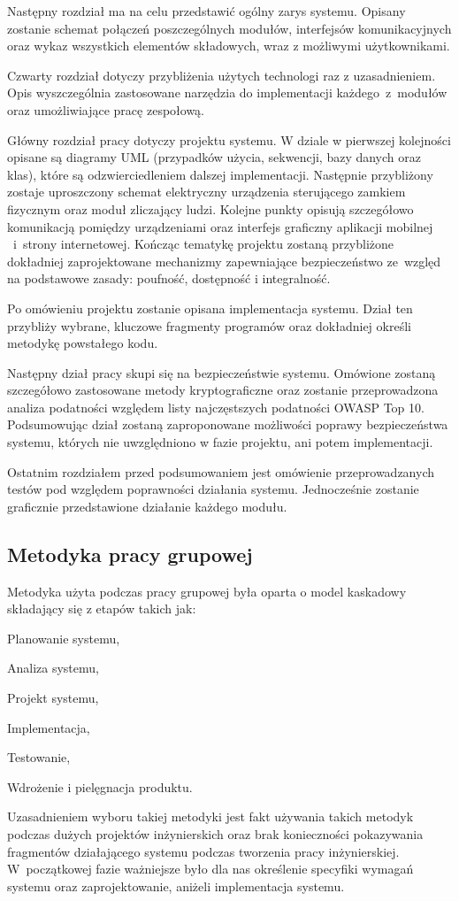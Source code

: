 Następny rozdział ma na celu przedstawić ogólny zarys systemu. Opisany zostanie schemat połączeń poszczególnych modułów, interfejsów komunikacyjnych oraz wykaz wszystkich elementów składowych, wraz z możliwymi użytkownikami.

Czwarty rozdział dotyczy przybliżenia użytych technologi raz z uzasadnieniem. Opis wyszczególnia zastosowane narzędzia do implementacji każdego~z~modułów oraz umożliwiające pracę zespołową.

Główny rozdział pracy dotyczy projektu systemu. W dziale w pierwszej kolejności opisane są diagramy UML (przypadków użycia, sekwencji, bazy danych oraz klas), które są odzwierciedleniem dalszej implementacji. Następnie przybliżony zostaje uproszczony schemat elektryczny urządzenia sterującego zamkiem fizycznym oraz moduł zliczający ludzi. Kolejne punkty opisują szczegółowo komunikacją pomiędzy urządzeniami oraz interfejs graficzny aplikacji mobilnej ~i~strony internetowej. Kończąc tematykę projektu zostaną przybliżone dokładniej zaprojektowane mechanizmy zapewniające bezpieczeństwo ze~względ na podstawowe zasady: poufność, dostępność i integralność.

Po omówieniu projektu zostanie opisana implementacja systemu. Dział ten przybliży wybrane, kluczowe fragmenty programów oraz dokładniej określi metodykę powstałego kodu. 

Następny dział pracy skupi się na bezpieczeństwie systemu. Omówione zostaną szczegółowo zastosowane metody kryptograficzne oraz zostanie przeprowadzona analiza podatności względem listy najczęstszych podatności OWASP Top 10. Podsumowując dział zostaną zaproponowane możliwości poprawy  bezpieczeństwa systemu, których nie uwzględniono w fazie projektu, ani potem implementacji.

Ostatnim rozdziałem przed podsumowaniem jest omówienie przeprowadzanych testów pod względem poprawności działania systemu. Jednocześnie zostanie graficznie przedstawione działanie każdego modułu.

\subsection{Metodyka pracy grupowej}
Metodyka użyta podczas pracy grupowej była oparta o model kaskadowy składający się z etapów takich jak:
\begin{itemize*}
	\item Planowanie systemu,
	\item Analiza systemu,
	\item Projekt systemu,
	\item Implementacja,
	\item Testowanie,
	\item Wdrożenie i pielęgnacja produktu.
\end{itemize*}

Uzasadnieniem wyboru takiej metodyki jest fakt używania takich metodyk podczas dużych projektów inżynierskich oraz brak konieczności pokazywania fragmentów działającego systemu podczas tworzenia pracy inżynierskiej. W~początkowej fazie ważniejsze było dla nas określenie specyfiki wymagań systemu oraz zaprojektowanie, aniżeli implementacja systemu\cite{waterfall}.